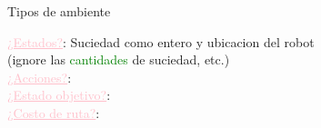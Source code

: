 
    \begin{frame}{Tipos de ambiente}
        \small{
            \textcolor{Pink}{\underline{¿Estados?}}: Suciedad como entero y ubicacion del robot \\          \hspace{1.8cm} (ignore las \textcolor{Green}{cantidades} de suciedad, etc.) \\
            \textcolor{Pink}{\underline{¿Acciones?}}: \\
            \textcolor{Pink}{\underline{¿Estado objetivo?}}: \\
            \textcolor{Pink}{\underline{¿Costo de ruta?}}: 
        }
        \break\break\break\break\break
    \end{frame}
